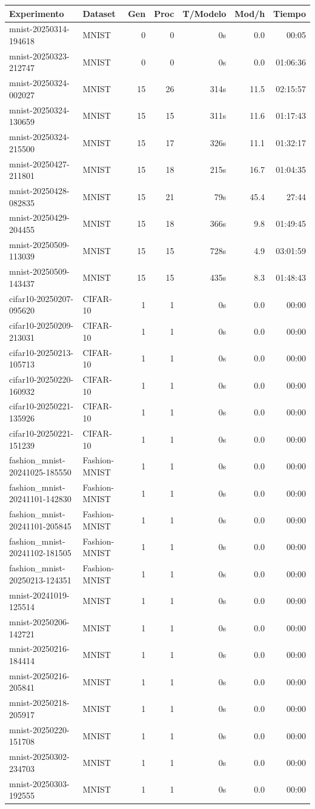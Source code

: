\begin{tabular}{llrrrrr}
\toprule
Experimento & Dataset & Gen & Proc & T/Modelo & Mod/h & Tiempo \\
\midrule
mnist-20250314-194618 & MNIST & 0 & 0 & 0s & 0.0 & 00:05 \\
mnist-20250323-212747 & MNIST & 0 & 0 & 0s & 0.0 & 01:06:36 \\
mnist-20250324-002027 & MNIST & 15 & 26 & 314s & 11.5 & 02:15:57 \\
mnist-20250324-130659 & MNIST & 15 & 15 & 311s & 11.6 & 01:17:43 \\
mnist-20250324-215500 & MNIST & 15 & 17 & 326s & 11.1 & 01:32:17 \\
mnist-20250427-211801 & MNIST & 15 & 18 & 215s & 16.7 & 01:04:35 \\
mnist-20250428-082835 & MNIST & 15 & 21 & 79s & 45.4 & 27:44 \\
mnist-20250429-204455 & MNIST & 15 & 18 & 366s & 9.8 & 01:49:45 \\
mnist-20250509-113039 & MNIST & 15 & 15 & 728s & 4.9 & 03:01:59 \\
mnist-20250509-143437 & MNIST & 15 & 15 & 435s & 8.3 & 01:48:43 \\
cifar10-20250207-095620 & CIFAR-10 & 1 & 1 & 0s & 0.0 & 00:00 \\
cifar10-20250209-213031 & CIFAR-10 & 1 & 1 & 0s & 0.0 & 00:00 \\
cifar10-20250213-105713 & CIFAR-10 & 1 & 1 & 0s & 0.0 & 00:00 \\
cifar10-20250220-160932 & CIFAR-10 & 1 & 1 & 0s & 0.0 & 00:00 \\
cifar10-20250221-135926 & CIFAR-10 & 1 & 1 & 0s & 0.0 & 00:00 \\
cifar10-20250221-151239 & CIFAR-10 & 1 & 1 & 0s & 0.0 & 00:00 \\
fashion_mnist-20241025-185550 & Fashion-MNIST & 1 & 1 & 0s & 0.0 & 00:00 \\
fashion_mnist-20241101-142830 & Fashion-MNIST & 1 & 1 & 0s & 0.0 & 00:00 \\
fashion_mnist-20241101-205845 & Fashion-MNIST & 1 & 1 & 0s & 0.0 & 00:00 \\
fashion_mnist-20241102-181505 & Fashion-MNIST & 1 & 1 & 0s & 0.0 & 00:00 \\
fashion_mnist-20250213-124351 & Fashion-MNIST & 1 & 1 & 0s & 0.0 & 00:00 \\
mnist-20241019-125514 & MNIST & 1 & 1 & 0s & 0.0 & 00:00 \\
mnist-20250206-142721 & MNIST & 1 & 1 & 0s & 0.0 & 00:00 \\
mnist-20250216-184414 & MNIST & 1 & 1 & 0s & 0.0 & 00:00 \\
mnist-20250216-205841 & MNIST & 1 & 1 & 0s & 0.0 & 00:00 \\
mnist-20250218-205917 & MNIST & 1 & 1 & 0s & 0.0 & 00:00 \\
mnist-20250220-151708 & MNIST & 1 & 1 & 0s & 0.0 & 00:00 \\
mnist-20250302-234703 & MNIST & 1 & 1 & 0s & 0.0 & 00:00 \\
mnist-20250303-192555 & MNIST & 1 & 1 & 0s & 0.0 & 00:00 \\
\bottomrule
\end{tabular}